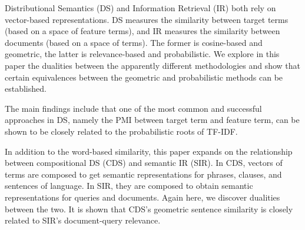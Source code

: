 

Distributional Semantics (DS)  and Information Retrieval (IR)  both rely on vector-based representations.
%
DS measures the similarity between target terms
(based on a space of feature terms), and IR
measures the similarity between documents
(based on a space of terms).
%
The former is cosine-based and geometric, the latter is relevance-based and probabilistic. We explore in this paper the dualities between the apparently different
methodologies and show that 
certain equivalences
between the geometric and probabilistic methods can be established. 


The main findings include that one of the most common and successful
approaches in DS,
namely the PMI between target term and feature term, can be shown to be
closely related to the probabilistic roots of TF-IDF. 

\hrulefill

In addition to the word-based similarity, this paper expands on the relationship
between compositional DS (CDS) and semantic IR (SIR).
%
In CDS,  vectors of terms are composed to get semantic representations for phrases, clauses, and sentences of language.
In SIR, they are composed to obtain semantic representations for queries and documents.
Again here, we discover dualities between the two. 
%
It is shown that CDS's geometric sentence similarity is closely related to SIR's document-query relevance. 